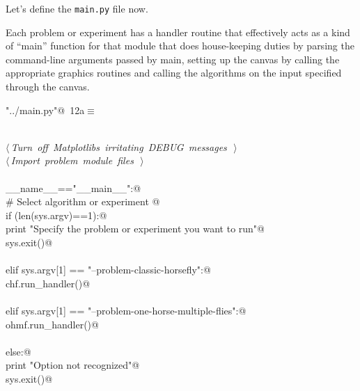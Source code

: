 \documentclass[11.5pt]{report}
\begin{document}
\newchunk Let's define the \verb|main.py| file now. 

Each problem or experiment has a handler routine 
that effectively acts as a kind of ``main'' function for that module that 
does house-keeping duties by parsing the command-line arguments passed by main, 
setting up the canvas by calling the appropriate graphics routines and calling 
the algorithms on the input specified through the canvas. 

\begin{flushleft} \small
\begin{minipage}{\linewidth}\label{scrap1}\raggedright\small
{} \verb@"../main.py"@\nobreak\ {\footnotesize {12a}}$\equiv$
\vspace{-1ex}
\begin{list}{}{} \item
\mbox{}\verb@@\\
\mbox{}\verb@@\hbox{$\langle\,${\itshape Turn off Matplotlibs irritating DEBUG messages}\nobreak\ {\footnotesize {}}$\,\rangle$}\verb@@\\
\mbox{}\verb@@\hbox{$\langle\,${\itshape Import problem module files}\nobreak\ {\footnotesize {}}$\,\rangle$}\verb@@\\
\mbox{}\verb@@\\
\mbox{}\verb@if __name__=="__main__":@\\
\mbox{}\verb@     # Select algorithm or experiment @\\
\mbox{}\verb@     if (len(sys.argv)==1):@\\
\mbox{}\verb@          print "Specify the problem or experiment you want to run"@\\
\mbox{}\verb@          sys.exit()@\\
\mbox{}\verb@@\\
\mbox{}\verb@     elif sys.argv[1] == "--problem-classic-horsefly":@\\
\mbox{}\verb@          chf.run_handler()@\\
\mbox{}\verb@@\\
\mbox{}\verb@     elif sys.argv[1] == "--problem-one-horse-multiple-flies":@\\
\mbox{}\verb@          ohmf.run_handler()@\\
\mbox{}\verb@@\\
\mbox{}\verb@     else:@\\
\mbox{}\verb@          print "Option not recognized"@\\
\mbox{}\verb@          sys.exit()@\\
\mbox{}\verb@@{\NWsep}
\end{list}
\vspace{-1.5ex}
\footnotesize
\begin{list}{}{\setlength{\itemsep}{-\parsep}\setlength{\itemindent}{-\leftmargin}}

\item{}
\end{list}
\end{minipage}\vspace{4ex}
\end{flushleft}
\end{document}
